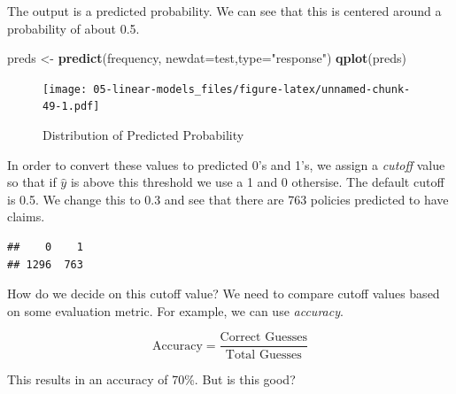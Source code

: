 \documentclass[openany]{book}
\newenvironment{Shaded}{\begin{snugshade}}{\end{snugshade}}
\newcommand{\DataTypeTok}[1]{\textcolor[rgb]{0.13,0.29,0.53}{#1}}
\newcommand{\DecValTok}[1]{\textcolor[rgb]{0.00,0.00,0.81}{#1}}
\newcommand{\KeywordTok}[1]{\textcolor[rgb]{0.13,0.29,0.53}{\textbf{#1}}}
\newcommand{\NormalTok}[1]{#1}
\newcommand{\OperatorTok}[1]{\textcolor[rgb]{0.81,0.36,0.00}{\textbf{#1}}}
\newcommand{\StringTok}[1]{\textcolor[rgb]{0.31,0.60,0.02}{#1}}
\begin{document}
The output is a predicted probability. We can see that this is centered around a probability of about 0.5.

\begin{Shaded}
\begin{Highlighting}[]
\NormalTok{preds <-}\StringTok{ }\KeywordTok{predict}\NormalTok{(frequency, }\DataTypeTok{newdat=}\NormalTok{test,}\DataTypeTok{type=}\StringTok{"response"}\NormalTok{)}
\KeywordTok{qplot}\NormalTok{(preds) }
\end{Highlighting}
\end{Shaded}

\begin{figure}
\centering
\texttt{[image: 05-linear-models\_files/figure-latex/unnamed-chunk-49-1.pdf]}
\caption{\label{fig:unnamed-chunk-49}Distribution of Predicted Probability}
\end{figure}

In order to convert these values to predicted 0's and 1's, we assign a \emph{cutoff} value so that if \(\hat{y}\) is above this threshold we use a 1 and 0 othersise. The default cutoff is 0.5. We change this to 0.3 and see that there are 763 policies predicted to have claims.

\begin{Shaded}
\end{Shaded}

\begin{verbatim}
##    0    1 
## 1296  763
\end{verbatim}

How do we decide on this cutoff value? We need to compare cutoff values based on some evaluation metric. For example, we can use \emph{accuracy}.

\[\text{Accuracy} = \frac{\text{Correct Guesses}}{\text{Total Guesses}}\]

This results in an accuracy of 70\%. But is this good?

\begin{Shaded}
\end{Shaded}
\end{document}
